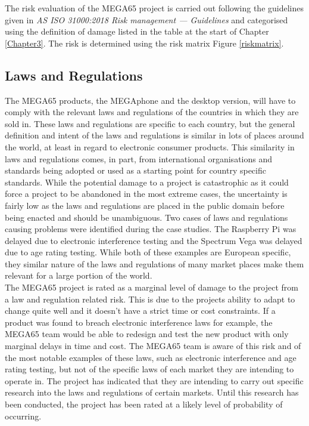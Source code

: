 The risk evaluation of the MEGA65 project is carried out following the guidelines given in \textit{AS ISO 31000:2018 Risk management — Guidelines} 
\cite{RN164} and categorised using the definition of damage listed in the table at the start of Chapter \ref{Chapter3}. The risk is determined using the risk matrix Figure \ref{riskmatrix}.

\subsection{Laws and Regulations}
The MEGA65 products, the MEGAphone and the desktop version, will have to comply with the relevant laws and regulations of the countries in which they are sold in. These laws and regulations are specific to each country, but the general definition and intent of the laws and regulations is similar in lots of places around the world, at least in regard to electronic consumer products. This similarity in laws and regulations comes, in part, from international organisations and standards being adopted or used as a starting point for country specific standards. While the potential damage to a project is catastrophic as it could force a project to be abandoned in the most extreme cases, the uncertainty is fairly low as the laws and regulations are placed in the public domain before being enacted and should be unambiguous. Two cases of laws and regulations causing problems were identified during the case studies. The Raspberry Pi was delayed due to electronic interference testing and the Spectrum Vega was delayed due to age rating testing. While both of these examples are European specific, they similar nature of the laws and regulations of many market places make them relevant for a large portion of the world. \\

The MEGA65 project is rated as a marginal level of damage to the project from a law and regulation related risk. This is due to the projects ability to adapt to change quite well and it doesn't have a strict time or cost constraints. If a product was found to breach electronic interference laws for example, the MEGA65 team would be able to redesign and test the new product with only marginal delays in time and cost. The MEGA65 team is aware of this risk and of the most notable examples of these laws, such as electronic interference and age rating testing, but not of the specific laws of each market they are intending to operate in. The project has indicated that they are intending to carry out specific research into the laws and regulations of certain markets. Until this research has been conducted, the project has been rated at a likely level of probability of occurring.  \\

